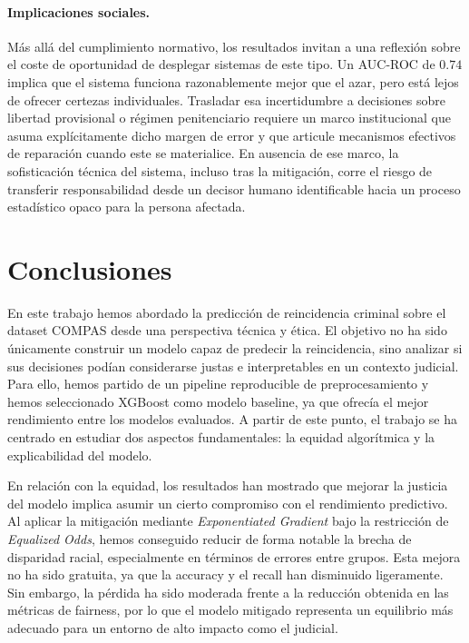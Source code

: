 \documentclass[11pt,a4paper]{article}
\begin{document}
\paragraph{Implicaciones sociales.} Más allá del cumplimiento normativo, los resultados invitan a una reflexión sobre el coste de oportunidad de desplegar sistemas de este tipo. Un AUC-ROC de $0.74$ implica que el sistema funciona razonablemente mejor que el azar, pero está lejos de ofrecer certezas individuales. Trasladar esa incertidumbre a decisiones sobre libertad provisional o régimen penitenciario requiere un marco institucional que asuma explícitamente dicho margen de error y que articule mecanismos efectivos de reparación cuando este se materialice. En ausencia de ese marco, la sofisticación técnica del sistema, incluso tras la mitigación, corre el riesgo de transferir responsabilidad desde un decisor humano identificable hacia un proceso estadístico opaco para la persona afectada.













\section{Conclusiones}
\label{sec:conclusiones}


En este trabajo hemos abordado la predicción de reincidencia criminal sobre el dataset COMPAS desde una perspectiva técnica y ética. El objetivo no ha sido únicamente construir un modelo capaz de predecir la reincidencia, sino analizar si sus decisiones podían considerarse justas e interpretables en un contexto judicial. Para ello, hemos partido de un pipeline reproducible de preprocesamiento y hemos seleccionado XGBoost como modelo baseline, ya que ofrecía el mejor rendimiento entre los modelos evaluados. A partir de este punto, el trabajo se ha centrado en estudiar dos aspectos fundamentales: la equidad algorítmica y la explicabilidad del modelo.

\vspace{0.3cm}

En relación con la equidad, los resultados han mostrado que mejorar la justicia del modelo implica asumir un cierto compromiso con el rendimiento predictivo. Al aplicar la mitigación mediante \textit{Exponentiated Gradient} bajo la restricción de \textit{Equalized Odds}, hemos conseguido reducir de forma notable la brecha de disparidad racial, especialmente en términos de errores entre grupos. Esta mejora no ha sido gratuita, ya que la accuracy y el recall han disminuido ligeramente. Sin embargo, la pérdida ha sido moderada frente a la reducción obtenida en las métricas de fairness, por lo que el modelo mitigado representa un equilibrio más adecuado para un entorno de alto impacto como el judicial.
\end{document}
